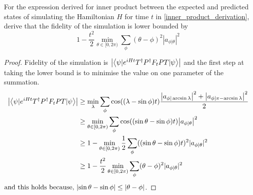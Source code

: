 \documentclass[
10pt, %
a4paper, %
oneside, %
headinclude,footinclude, %
BCOR5mm, %
]{scrartcl}
\begin{document}
\begin{theorem}\label{fidelity_derivation}
For the expression derived for inner product between the expected and predicted states of simulating the Hamiltonian $H$ for time $t$ in \ref{inner_product_derivation}, derive that the fidelity of the simulation is lower bounded by
$$1 - \frac{t^2}{2}\min_{\theta \in [0, 2\pi)} \sum_\phi (\theta - \phi)^2 |a_{\phi|\theta}|^2$$
\end{theorem}
\begin{proof}
Fidelity of the simulation is $\abs{\left<\psi|e^{iHt}T^{\dagger}P^{\dagger}F_tPT|\psi\right>}$ and the first step at taking the lower bound is to minimise the value on one parameter of the summation.
\begin{align*}
\abs{\left<\psi|e^{iHt}T^{\dagger}P^{\dagger}F_tPT|\psi\right>}&\geq\min_\lambda\sum_\phi\cos((\lambda-\sin\phi)t)\frac{\abs{a_{\phi|\arcsin\lambda}}^2+\abs{a_{\phi|\pi-\arcsin\lambda}}^2}{2}\\
&\geq\min_{\theta\in[0,2\pi)}\sum_\phi\cos((\sin\theta-\sin\phi)t)\abs{a_{\phi|\theta}}^2\\
&\geq 1 - \min_{\theta \in [0,2\pi)} \frac{1}{2} \sum_{\phi} ((\sin \theta - \sin\phi)t)^2 |a_{\phi|\theta}|^2\\
&\geq 1 - \frac{t^2}{2}\min_{\theta \in [0, 2\pi)} \sum_\phi (\theta - \phi)^2 |a_{\phi|\theta}|^2
\end{align*}
$\text{and this holds because, } \abs{\sin\theta-\sin\phi}\leq\abs{\theta-\phi}$.
\end{proof}
\end{document}
